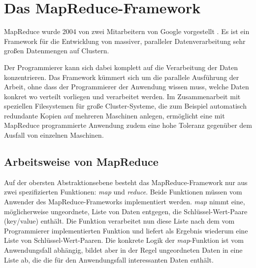 \section{Das MapReduce-Framework}
MapReduce wurde 2004 von zwei Mitarbeitern von Google vorgestellt \cite{dean2008mapreduce}. Es ist ein Framework
für die Entwicklung von massiver, paralleler Datenverarbeitung sehr großen Datenmengen auf Clustern.



Der Programmierer
kann sich dabei komplett auf die Verarbeitung der Daten konzentrieren. Das Framework kümmert sich um die parallele
Ausführung der Arbeit, ohne dass der Programmierer der Anwendung wissen muss, welche Daten konkret wo verteilt vorliegen
und verarbeitet werden. 
Im Zusammenarbeit mit speziellen Filesystemen 
für große Cluster-Systeme, die zum Beispiel automatisch redundante Kopien auf mehreren Maschinen anlegen, ermöglicht
eine mit MapReduce programmierte Anwendung zudem eine hohe Toleranz gegenüber dem Ausfall von einzelnen Maschinen.

\subsection{Arbeitsweise von MapReduce}
Auf der obersten Abstraktionsebene besteht das MapReduce-Framework nur aus zwei spezifizierten Funktionen: \textit{map} und \textit{reduce}.
Beide Funktionen müssen vom Anwender des MapReduce-Frameworks implementiert werden.
\textit{map} nimmt eine, möglicherweise ungeordnete, Liste von Daten entgegen, die Schlüssel-Wert-Paare (key/value) enthält. Die Funktion 
verarbeitet nun diese Liste nach dem vom Programmierer implementierten Funktion und liefert als Ergebnis wiederum eine
Liste von Schlüssel-Wert-Paaren. Die konkrete Logik der \textit{map}-Funktion ist vom Anwendungsfall abhängig, bildet aber in der Regel
ungeordneten Daten in eine Liste ab, die die für den Anwendungsfall interessanten Daten enthält. 




